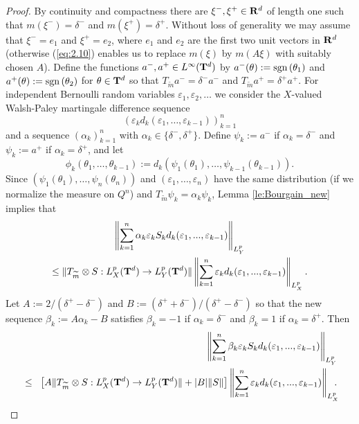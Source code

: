 \documentclass[11pt,a4paper,twoside,draft]{amsart}
\theoremstyle{definition}
\newcommand{\real}{{\bf R}}
\newcommand{\sgn}{{\rm sgn}\,}
\newcommand{\torus}{{\bf T}}
\newcommand{\vare}{\varepsilon}
\newcommand{\al}{\alpha}
\newcommand{\refeq}[1]{(\ref{#1})}
\begin{document}
\begin{proof}
By continuity and compactness there are 
$\xi^-,\xi^+\in\real^d$ of length one such that $m(\xi^-)=\delta^-$ 
and $m(\xi^+)=\delta^+$. Without loss of generality we may assume that 
$\xi^-=e_1$ and $\xi^+=e_2$, where $e_1$ and $e_2$ are the first two unit 
vectors in $\real^d$ (otherwise \refeq{eq:2.10} enables us to replace $m(\xi)$ by 
$m(A\xi )$ with suitably chosen $A$).
Define the functions $a^-,a^+\in L^\infty (\torus^d)$ by
$a^-(\theta):=\sgn (\theta_1)$ and  $a^+(\theta):=\sgn (\theta_2)$ for 
$\theta\in\torus^d$ so that
$T_{\widetilde{m}}a^- = \delta^- a^-$ and $T_{\widetilde{m}}a^+ =\delta^+ a^+$.
For independent Bernoulli random variables 
$\varepsilon_1,\varepsilon_2,\ldots$ we consider the $X$-valued 
Walsh-Paley martingale difference sequence 
\[ (\vare_k d_k(\vare_1,\ldots ,\vare_{k-1}))_{k=1}^n \]
and a sequence $(\al_k)_{k=1}^n$ with $\al_k \in \{ \delta^-,\delta^+ \}$. 
Define $\psi_k:=a^-$ if $\al_k=\delta^-$ and $\psi_k:=a^+$ if $\al_k=\delta^+$, and let
\[       \phi_k(\theta_1,\ldots ,\theta_{k-1})
   := d_k(\psi_1(\theta_1),\ldots,\psi_{k-1}(\theta_{k-1})). \]
Since $(\psi_1(\theta_1),\ldots ,\psi_n(\theta_n))$
and $(\vare_1,\ldots,\vare_n)$ have the same distribution 
(if we normalize the measure on $Q^n$) and 
$T_{\widetilde m}\psi_k = \alpha_k \psi_k$, Lemma \ref{le:Bourgain_new}
implies that 
\begin{multline*}
   \left \| \sum_{k=1}^n \alpha_k \vare_k S_k d_k(\vare_1,...,\vare_{k-1})
   \right \|_{L_Y^p} \\
   \le \| T_{\widetilde m}\otimes S: L^p_X(\torus^d)\to L^p_Y(\torus^d) \|
       \left \| \sum_{k=1}^n \vare_k d_k(\vare_1,...,\vare_{k-1})
       \right \|_{L_X^p}.
\end{multline*}
Let 
$A:=2/(\delta^+-\delta^-)$ and 
$B:=(\delta^+ +\delta^-)/(\delta^+-\delta^-)$ 
so that the new sequence $\beta_k := A \alpha_k - B$ satisfies 
$\beta_k=-1$ if $\alpha_k=\delta^-$ and  $\beta_k= 1$ if $\alpha_k=\delta^+$.
Then 
\begin{eqnarray*}
&   & \hspace*{-1em}
      \left \| \sum_{k=1}^n \beta_k \vare_k S_k d_k(\vare_1,...,\vare_{k-1})
      \right \|_{L_Y^p} \\
&\le& \!
      \left [ A  \| T_{\widetilde m}\otimes S: L^p_X(\torus^d)\to L^p_Y(\torus^d) \|
              + |B|  \| S \| \right ]
       \left \| \sum_{k=1}^n \vare_k d_k(\vare_1,...,\vare_{k-1})
       \right \|_{L_X^p}\!\!\!\!  .
\end{eqnarray*}

\end{proof}
\end{document}
